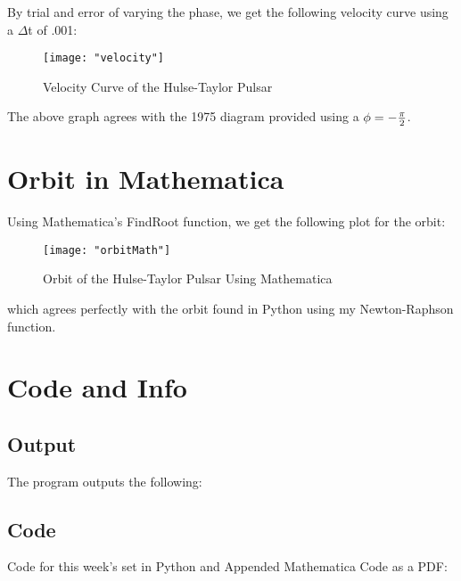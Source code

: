 \documentclass{article}
\begin{document}
By trial and error of varying the phase, we get the following velocity curve using a $\Delta$t of .001:

\begin{figure}[h!]
	\centering
	\texttt{[image: "velocity"]}
	\caption{Velocity Curve of the Hulse-Taylor Pulsar}
\end{figure} 
\FloatBarrier

The above graph agrees with the 1975 diagram provided using a $\phi = - {\pi \over 2}$.

\section{Orbit in Mathematica}

Using Mathematica's FindRoot function, we get the following plot for the orbit:

\begin{figure}[h!]
	\centering
	\texttt{[image: "orbitMath"]}
	\caption{Orbit of the Hulse-Taylor Pulsar Using Mathematica}
\end{figure} 
\FloatBarrier

which agrees perfectly with the orbit found in Python using my Newton-Raphson function.

\section{Code and Info}

\subsection{Output}
The program outputs the following:


\subsection{Code}
Code for this week's set in Python and Appended Mathematica Code as a PDF:



\end{document}
